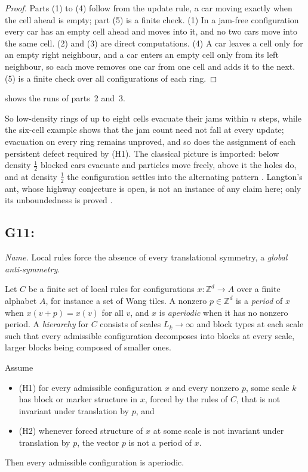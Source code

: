\begin{proof}
Parts (1) to (4) follow from the update rule, a car moving exactly when the cell ahead is empty; part (5) is a
finite check.
(1) In a jam-free configuration every car has an empty cell ahead and moves into it, and no two cars
move into the same cell. (2) and (3) are direct computations. (4) A car leaves a cell only for an
empty right neighbour, and a car enters an empty cell only from its left neighbour, so each move
removes one car from one cell and adds it to the next. (5) is a finite check over all configurations
of each ring.
\end{proof}

 shows the runs of parts~2 and~3.



So low-density rings of up to eight cells evacuate their jams within $n$ steps, while the six-cell
example shows that the jam count need not fall at every update; evacuation on every ring remains
unproved, and so does the assignment of each persistent defect required by \textup{(H1)}. The classical
picture is imported: below density $\tfrac12$ blocked cars evacuate and particles move freely,
above it the holes do, and at density $\tfrac12$ the configuration settles into the alternating
pattern \citep{Fuks1997,Nagel1996,ChowdhurySantenSchadschneider2000}. Langton's ant, whose highway
conjecture is open, is not an instance of any claim here; only its unboundedness is proved
\citep{BunimovichTroubetzkoy1992}.

\subsection{G11: \lawGEleven}\label{sec:G11}

\emph{Name.} Local rules force the absence of every translational symmetry, a \emph{global
anti-symmetry}.

Let $C$ be a finite set of local rules for configurations $x : \mathbb{Z}^d \to A$ over a finite
alphabet $A$, for instance a set of Wang tiles. A nonzero $p \in \mathbb{Z}^d$ is a \emph{period}
of $x$ when $x(v + p) = x(v)$ for all $v$, and $x$ is \emph{aperiodic} when it has no nonzero period.
A \emph{hierarchy} for $C$ consists of scales $L_k \to \infty$ and block types at each scale such
that every admissible configuration decomposes into blocks at every scale, larger blocks being
composed of smaller ones.

\begin{schema}\label{thm:G11}
Assume
\begin{itemize}
  \item \textup{(H1)} for every admissible configuration $x$ and every nonzero $p$, some
    scale $k$ has block or marker structure in $x$, forced by the rules of $C$, that is not
    invariant under translation by $p$, and
  \item \textup{(H2)} whenever forced structure of $x$ at some scale is not invariant
    under translation by $p$, the vector $p$ is not a period of $x$.
\end{itemize}
Then every admissible configuration is aperiodic.
\end{schema}

